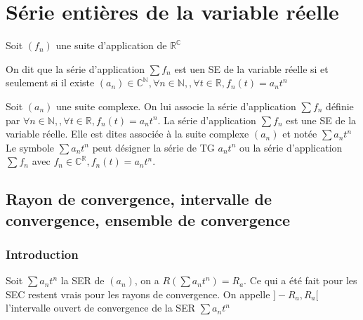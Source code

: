 \documentclass[11pt,hidelinks]{book}
\theoremstyle{mytheoremstyle}
\theoremstyle{mytheoremstyle}
\theoremstyle{mytheoremstyle}
\theoremstyle{mytheoremstyle}
\theoremstyle{mytheoremstyle}
\theoremstyle{mytheoremstyle}
\theoremstyle{mytheoremstyle}
\theoremstyle{mytheoremstyle}
\theoremstyle{myproblemstyle}
\def\mbb#1{\mathbb{#1}}
\def\bN{\mbb{N}}
\def\bC{\mbb{C}}
\def\bR{\mbb{R}}
\def\ser{\sum a_n t^n}
\def\fn{\forall n \in \bN,}
\newcommand{\parenth}[1]{\left(#1\right)}
\begin{document}
\section{Série entières de la variable réelle}
\begin{definition}
    Soit $(f_n)$ une suite d'application de $\bR^{\bC}$
    
    
    On dit que la série d'application $\sum f_n$ est uen SE de 
    la variable réelle si et seulement si il existe $(a_n) \in \bC^{\bN}, 
    \fn, \forall t \in \bR, f_n(t) = a_n t^n$ 
\end{definition}
\begin{rmq}
    Soit $(a_n)$ une suite complexe. On lui associe la série d'application 
    $\sum f_n$ définie par $\fn, \forall t \in \bR, f_n(t) = a_n t^n$. 
    La série d'application $\sum f_n$ est une SE de la variable réelle.
    Elle est dites associée à la suite complexe $(a_n)$ et notée $\ser$ 
    Le symbole $\ser$ peut désigner la série de TG $a_n t^n$ ou la série d'application 
    $\sum f_n$ avec $f_n \in \bC^{\bR}, f_n(t) = a_n t^n$.
\end{rmq}
\subsection{Rayon de convergence, intervalle de convergence, ensemble de convergence}
\subsubsection{Introduction}
Soit $\ser$ la SER de $(a_n)$, on a $R\parenth{\ser} = R_a$.
Ce qui a été fait pour les SEC restent vrais pour les rayons de convergence.
On appelle $]-R_a, R_a[$ l'intervalle ouvert de convergence de la SER $\ser$
\end{document}
